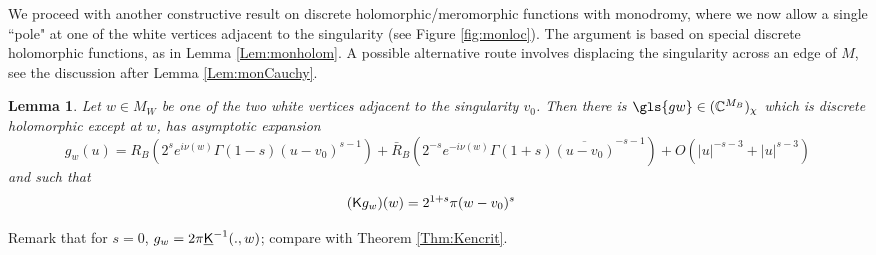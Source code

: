\documentclass[10pt]{article}
\newcommand{\C}{\mathbb{C}}
\newcommand{\rK}{{\sf K}}
\newcommand{\uK}{{\underline {\sf K}}}
\newtheorem{Lem}[thm]{Lemma}
\begin{document}
We proceed with another constructive result on discrete holomorphic/meromorphic functions with monodromy, where we now allow a single ``pole" at one of the white vertices adjacent to the singularity (see Figure \ref{fig:monloc}). The argument is based on special discrete holomorphic functions, as in Lemma \ref{Lem:monholom}. A possible alternative route involves displacing the singularity across an edge of $M$, see the discussion after Lemma \ref{Lem:monCauchy}.



\begin{Lem}\label{Lem:monpole}
Let $w\in M_W$ be one of the two white vertices adjacent to the singularity $v_0$. Then there is $\gls{gw}\in (\C^{M_B})_\chi$ which is discrete holomorphic except at $w$, has asymptotic expansion
$$g_w(u)=R_B\left(2^{s}e^{i\nu(w)}\Gamma(1-s)(u-v_0)^{s-1}\right)+\bar R_B\left(2^{-s}e^{-i\nu(w)}\Gamma(1+s)\overline{(u-v_0)}^{-s-1}\right)+O(|u|^{-s-3}+|u|^{s-3})$$
and such that
\begin{align*}
(\rK g_w)(w)&=2^{1+s}\pi(w-v_0)^{s}
%
\end{align*}
\end{Lem}
Remark that for $s=0$, $g_w=2\pi\uK^{-1}(.,w)$; compare with Theorem \ref{Thm:Kencrit}.
\end{document}
